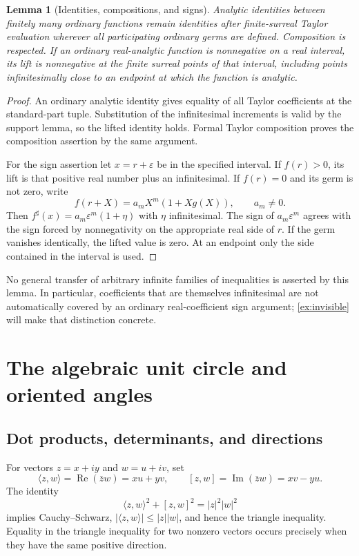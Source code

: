 \documentclass[11pt,letterpaper]{article}
\newtheorem{lemma}[theorem]{Lemma}
\theoremstyle{definition}
\theoremstyle{remark}
\newcommand{\Rea}{\operatorname{Re}}\newcommand{\Ima}{\operatorname{Im}}
\newcommand{\sh}{^{\sharp}}
\numberwithin{equation}{section}
\begin{document}
\begin{lemma}[Identities, compositions, and signs]\label{lem:lifting}
Analytic identities between finitely many ordinary functions remain identities after finite-surreal Taylor evaluation wherever all participating ordinary germs are defined. Composition is respected. If an ordinary real-analytic function is nonnegative on a real interval, its lift is nonnegative at the finite surreal points of that interval, including points infinitesimally close to an endpoint at which the function is analytic.
\end{lemma}
\begin{proof}
An ordinary analytic identity gives equality of all Taylor coefficients at the standard-part tuple. Substitution of the infinitesimal increments is valid by the support lemma, so the lifted identity holds. Formal Taylor composition proves the composition assertion by the same argument.

For the sign assertion let $x=r+\varepsilon$ be in the specified interval. If $f(r)>0$, its lift is that positive real number plus an infinitesimal. If $f(r)=0$ and its germ is not zero, write
\[
 f(r+X)=a_mX^m(1+Xg(X)),\qquad a_m\ne0.
\]
Then $f\sh(x)=a_m\varepsilon^m(1+\eta)$ with $\eta$ infinitesimal. The sign of $a_m\varepsilon^m$ agrees with the sign forced by nonnegativity on the appropriate real side of $r$. If the germ vanishes identically, the lifted value is zero. At an endpoint only the side contained in the interval is used.
\end{proof}

No general transfer of arbitrary infinite families of inequalities is asserted by this lemma. In particular, coefficients that are themselves infinitesimal are not automatically covered by an ordinary real-coefficient sign argument; \cref{ex:invisible} will make that distinction concrete.

\section{The algebraic unit circle and oriented angles}\label{sec:circle}
\subsection{Dot products, determinants, and directions}
For vectors $z=x+iy$ and $w=u+iv$, set
\[
 \langle z,w\rangle=\Rea(\bar zw)=xu+yv,
 \qquad [z,w]=\Ima(\bar zw)=xv-yu.
\]
The identity
\begin{equation}\label{eq:lagrange}
 \langle z,w\rangle^2+[z,w]^2=|z|^2|w|^2
\end{equation}
implies Cauchy--Schwarz, $|\langle z,w\rangle|\le|z||w|$, and hence the triangle inequality. Equality in the triangle inequality for two nonzero vectors occurs precisely when they have the same positive direction.
\end{document}
